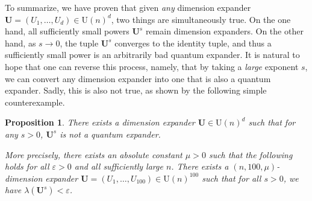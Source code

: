 \documentclass[11pt]{article}
\newtheorem{proposition}[theorem]{Proposition}
\theoremstyle{plain}
\numberwithin{equation}{section}
\theoremstyle{definition}
\newcommand{\U}{\mathrm{U}}
\newcommand{\tuple}[1]{\mathbf{#1}}
\newcommand{\vU}{\tuple{U}}
\begin{document}
To summarize, we have proven that given \emph{any} dimension expander $\vU=(U_1,\dots,U_d) \in \U(n)^d$, two things are simultaneously true. On the one hand, all sufficiently small powers $\vU^s$ remain dimension expanders. On the other hand, as $s \to 0$, the tuple $\vU^s$ converges to the identity tuple, and thus a sufficiently small power is an arbitrarily bad quantum expander. It is natural to hope that one can 
%
reverse
%
this
%
process,  %
namely, that by taking a \emph{large} %
exponent $s$,  %
we can convert any dimension expander into one that is also a quantum expander. Sadly, this is also not true, as shown by the following simple counterexample. 
\begin{proposition}
  There exists %
a  %
dimension expander $\vU \in \U(n)^d$ such that for any $s>0$, ${\vU^s}$ is not a quantum expander. 

    More precisely, there exists an absolute constant $\mu >0$ such that the following holds for all $\varepsilon>0$ and all sufficiently large $n$. There exists a $(n,100,\mu)$-dimension expander $\vU = (U_1,\dots,U_{100}) \in \U(n)^{100}$ such that for all $s>0$, we have $\lambda({\vU^s})< \varepsilon$.
\end{proposition}
\end{document}
